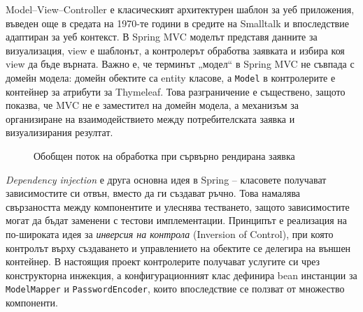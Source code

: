 Model--View--Controller \cite{springmvc} е класическият архитектурен шаблон за уеб приложения, въведен още в средата на 1970-те години в средите на Smalltalk и впоследствие адаптиран за уеб контекст. В Spring MVC моделът представя данните за визуализация, view е шаблонът, а контролерът обработва заявката и избира коя view да бъде върната. Важно е, че терминът „модел“ в Spring MVC не съвпада с домейн модела: домейн обектите са entity класове, а \texttt{Model} в контролерите е контейнер за атрибути за Thymeleaf. Това разграничение е съществено, защото показва, че MVC не е заместител на домейн модела, а механизъм за организиране на взаимодействието между потребителската заявка и визуализирания резултат.

\begin{figure}[H]
    \centering
    \caption{Обобщен поток на обработка при сървърно рендирана заявка}
    \label{fig:mvc-request-flow}
\end{figure}

\textit{Dependency injection} е друга основна идея в Spring \cite{springboot} -- класовете получават зависимостите си отвън, вместо да ги създават ръчно. Това намалява свързаността между компонентите и улеснява тестването, защото зависимостите могат да бъдат заменени с тестови имплементации. Принципът е реализация на по-широката идея за \textit{инверсия на контрола} (Inversion of Control), при която контролът върху създаването и управлението на обектите се делегира на външен контейнер. В настоящия проект контролерите получават услугите си чрез конструкторна инжекция, а конфигурационният клас дефинира bean инстанции за \texttt{ModelMapper} и \texttt{PasswordEncoder}, които впоследствие се ползват от множество компоненти.

